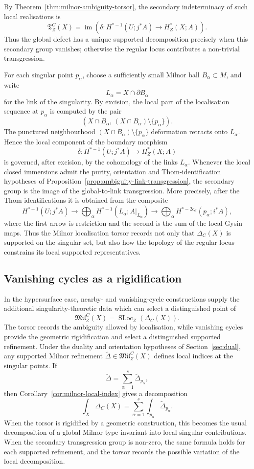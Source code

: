\documentclass[10pt,a4paper,dvipsnames,x11names]{amsart}
\newcommand{\SLoc}{\operatorname{SLoc}}
\newcommand{\TLoc}{\mathfrak T}
\numberwithin{equation}{section}
\theoremstyle{plain}
\theoremstyle{definition}
\theoremstyle{remark}
\begin{document}
By Theorem~\ref{thm:milnor-ambiguity-torsor}, the secondary indeterminacy of such local
realisations is
\[
\TLoc^C_Z(X)
=
\operatorname{im}\left(
\delta:H^{*-1}(U;j^*A)\longrightarrow H^*_Z(X;A)
\right).
\]
Thus the global defect has a unique supported decomposition precisely when this secondary group vanishes; otherwise the regular locus contributes a non-trivial transgression.

For each singular point $p_\alpha$, choose a sufficiently small Milnor ball
$B_\alpha\subset M$, and write
\[
L_\alpha=X\cap \partial B_\alpha
\]
for the link of the singularity.  By excision, the local part of the
localisation sequence at $p_\alpha$ is computed by the pair
\[
(X\cap B_\alpha,\,(X\cap B_\alpha)\setminus\{p_\alpha\}).
\]
The punctured neighbourhood
$
(X\cap B_\alpha)\setminus\{p_\alpha\}
$
deformation retracts onto $L_\alpha$.  Hence the local component of the
boundary morphism
\[
\delta:H^{*-1}(U;j^*A)\longrightarrow H^*_Z(X;A)
\]
is governed, after excision, by the cohomology of the links $L_\alpha$.
Whenever the local closed immersions admit the purity, orientation and Thom-identification hypotheses of
Proposition~\ref{prop:ambiguity-link-transgression}, the secondary group is the image of the global-to-link transgression.  More precisely, after the Thom identifications it is obtained from the composite
\[
H^{*-1}(U;j^*A)\longrightarrow
\bigoplus_\alpha H^{*-1}(L_\alpha;A|_{L_\alpha})\longrightarrow
\bigoplus_\alpha H^{*-2c_\alpha}(p_\alpha;i^*A),
\]
where the first arrow is restriction and the second is the sum of the local Gysin maps.  Thus the Milnor localisation torsor records not only that $\Delta_C(X)$ is supported on the singular set, but also how the topology of the regular locus constrains its local supported representatives.

\subsection{Vanishing cycles as a rigidification}
\label{subsec:vanishing-cycles-rigidification}

In the hypersurface case, nearby- and vanishing-cycle constructions supply the additional singularity-theoretic data which can select a distinguished point of
\[
\mathfrak{Mil}^C_Z(X)=\SLoc_Z(\Delta_C(X)).
\]
The torsor records the ambiguity allowed by localisation, while vanishing cycles provide the geometric rigidification and select a distinguished supported refinement.
Under the duality and orientation hypotheses of Section~\ref{sec:dual}, any
supported Milnor refinement
$
\widetilde{\Delta}\in\mathfrak{Mil}^C_Z(X)
$
defines local indices at the singular points.  If
\[
\widetilde{\Delta}
=
\sum_{\alpha=1}^s\widetilde{\Delta}_{p_\alpha},
\]
then Corollary~\ref{cor:milnor-local-index} gives a decomposition
\[
\int_X\Delta_C(X)
=
\sum_{\alpha=1}^s
\int_{p_\alpha}\widetilde{\Delta}_{p_\alpha}.
\]
When the torsor is rigidified by a geometric construction, this becomes the
usual decomposition of a global Milnor-type invariant into local singular
contributions.  When the secondary transgression group is non-zero, the same formula holds
for each supported refinement, and the torsor records the possible variation of
the local decomposition.
\end{document}
